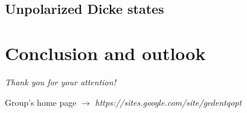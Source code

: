 \documentclass{beamer}
\begin{document}
		\begin{frame}


		\end{frame}

	\subsection{Unpolarized Dicke states}

		\begin{frame}


		\end{frame}

\section{Conclusion and outlook}

	\begin{frame}


	\end{frame}

	\begin{frame}
		\emph{\Large Thank you for your attention!}

		\vspace{5px}
		Group's home page $\rightarrow$ \emph{\color{blue} https://sites.google.com/site/gedentqopt}

	\end{frame}
\end{document}
